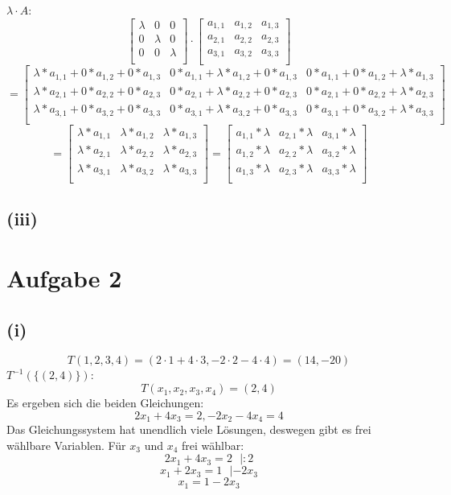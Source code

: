 \documentclass{article}
\begin{document}
$\lambda \cdot A$:
\[
\begin{bmatrix}
\lambda & 0 & 0 \\
0 & \lambda & 0 \\
0 & 0 & \lambda \\
\end{bmatrix}
 \cdot 
\begin{bmatrix}
    a_{1,1} & a_{1,2} & a_{1,3}\\
    a_{2,1} & a_{2,2} & a_{2,3} \\
    a_{3,1} & a_{3,2} &a_{3,3}\\
\end{bmatrix}\]  \[ = 
\begin{bmatrix}
    \lambda*a_{1,1}+0*a_{1,2}+0*a_{1,3}&0*a_{1,1}+\lambda*a_{1,2}+0*a_{1,3} &0*a_{1,1}+0*a_{1,2}+\lambda*a_{1,3} \\
    \lambda*a_{2,1}+0*a_{2,2}+0*a_{2,3}&0*a_{2,1}+\lambda*a_{2,2}+0*a_{2,3} &0*a_{2,1}+0*a_{2,2}+\lambda*a_{2,3} \\
    \lambda*a_{3,1}+0*a_{3,2}+0*a_{3,3}&0*a_{3,1}+\lambda*a_{3,2}+0*a_{3,3} &0*a_{3,1}+0*a_{3,2}+\lambda*a_{3,3} \\
\end{bmatrix}\]\[ =
\begin{bmatrix}
    \lambda*a_{1,1}&\lambda*a_{1,2} &\lambda*a_{1,3} \\
    \lambda*a_{2,1}&\lambda*a_{2,2}&\lambda*a_{2,3} \\
    \lambda*a_{3,1}&\lambda*a_{3,2}&\lambda*a_{3,3} \\
\end{bmatrix} =
\begin{bmatrix}
 a_{1,1}*\lambda& a_{2,1}*\lambda& a_{3,1}*\lambda\\
a_{1,2}*\lambda& a_{2,2}*\lambda& a_{3,2}*\lambda\\
 a_{1,3}*\lambda&a_{2,3}*\lambda & a_{3,3}*\lambda\\
\end{bmatrix}
\]

\subsection{(iii)}

\section{Aufgabe 2}
\subsection{(i)}
\[T(1,2,3,4)=(2\cdot1+4\cdot3, -2\cdot2-4\cdot4) =(14,-20)\]
$T^{-1}(\{(2,4)\})$:
\[T(x_1,x_2,x_3,x_4)=(2,4)\]
Es ergeben sich die beiden Gleichungen:
\[2x_1+4x_3=2, -2x_2-4x_4=4\]
Das Gleichungssystem hat unendlich viele Lösungen, deswegen gibt es frei wählbare Variablen. Für $x_3$ und $x_4$ frei wählbar:
\[2x_1+4x_3=2 \ \ \ |:2\] 
\[x_1+2x_3=1\ \ \ |-2x_3\]
\[x_1=1-2x_3\]
\end{document}
